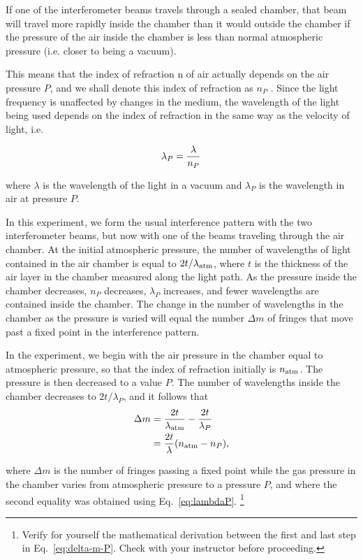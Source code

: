 \documentclass{tufte-handout}
\begin{document}
If one of the interferometer beams travels through a sealed chamber, 
that beam will travel more rapidly inside the chamber than it 
would outside the chamber if the pressure of the air inside the 
chamber is less than normal atmospheric pressure (i.e. closer 
to being a vacuum).

This means that the index of refraction n of air actually depends 
on the air pressure $P$, and we shall denote this index of refraction 
as $n_P$ . Since the light frequency is unaffected by changes in 
the medium, the wavelength of the light being used depends on 
the index of refraction in the same way as the velocity of light, 
i.e.

\begin{equation}
\lambda_P = {\lambda \over n_P}
\label{eq:lambdaP}
\end{equation}

\noindent where $\lambda$ is the wavelength of the light in a vacuum and
$\lambda_P$ is the wavelength in air at pressure $P$.

In this experiment, we form the usual interference pattern with the two
interferometer beams, but now with one of the beams traveling through the air
chamber. At the initial atmospheric pressure, the number of wavelengths of light
contained in the air chamber is equal to $2t/\lambda_{\rm atm}$, where $t$ is
the thickness of the air layer in the chamber measured along the light
path. As the pressure inside
the chamber decreases, $n_P$ decreases, $\lambda_P$ increases, and fewer
wavelengths are contained inside the chamber. The change in the number of
wavelengths in the chamber as the pressure is varied will equal the number
$\Delta m$ of fringes that move past a fixed point in the interference pattern.

In the experiment, we begin with the air pressure in the chamber 
equal to atmospheric pressure, so that the index of refraction 
initially is $n_{\rm atm}$. The pressure is then decreased to a value 
$P$. The number of wavelengths inside the chamber decreases to 
$2t/\lambda_P$, and it follows that
\begin{align}
\Delta m &= \frac{2t}{\lambda_{\rm atm}} - \frac{2t}{\lambda_P} \nonumber \\ 
 &= \frac{2t}{\lambda} ( n_{\rm atm} - n_P ),
\label{eq:delta-m-P}
\end{align}

\noindent where $\Delta m$ is the number of fringes passing a fixed point while
the gas pressure in the chamber varies from atmospheric pressure to a pressure
$P$, and where the second equality was obtained using Eq.~\ref{eq:lambdaP}.
\footnote{Verify for yourself the mathematical derivation between the first and last
step in Eq.~\ref{eq:delta-m-P}. Check with your instructor before proceeding.}
\end{document}
